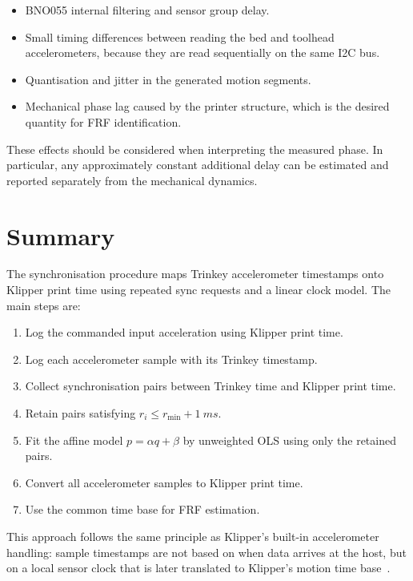 \documentclass[11pt,a4paper]{article}
\begin{document}
\begin{itemize}
    \item BNO055 internal filtering and sensor group delay.
    \item Small timing differences between reading the bed and toolhead
    accelerometers, because they are read sequentially on the same I2C bus.
    \item Quantisation and jitter in the generated motion segments.
    \item Mechanical phase lag caused by the printer structure, which is the
    desired quantity for FRF identification.
\end{itemize}

These effects should be considered when interpreting the measured phase. In
particular, any approximately constant additional delay can be estimated and
reported separately from the mechanical dynamics.

\section{Summary}

The synchronisation procedure maps Trinkey accelerometer timestamps onto
Klipper print time using repeated sync requests and a linear clock model. The
main steps are:

\begin{enumerate}
    \item Log the commanded input acceleration using Klipper print time.
    \item Log each accelerometer sample with its Trinkey timestamp.
    \item Collect synchronisation pairs between Trinkey time and Klipper print
    time.
    \item Retain pairs satisfying
    \(r_i \leq r_{\min}+\SI{1}{ms}\).
    \item Fit the affine model \(p = \alpha q + \beta\) by unweighted OLS using
    only the retained pairs.
    \item Convert all accelerometer samples to Klipper print time.
    \item Use the common time base for FRF estimation.
\end{enumerate}

This approach follows the same principle as Klipper's built-in accelerometer
handling: sample timestamps are not based on when data arrives at the host, but
on a local sensor clock that is later translated to Klipper's motion time
base~\cite{klipperapiserver}.
\end{document}
